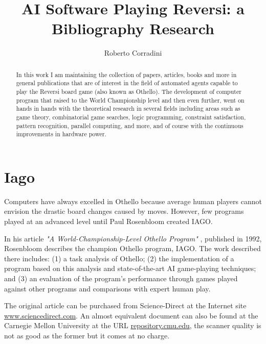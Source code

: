 \documentclass[twoside, 3p, times, a4paper, 11pt, onecolumn]{elsarticle}
\begin{document}
\begin{frontmatter}
  \title{AI Software Playing Reversi: a Bibliography Research}

  \author[rcrr]{Roberto Corradini}
  \address[rcrr]{Indipendent researcher, Milan, Italy - rob\_corradini@yahoo.it}

  \begin{abstract}
    In this work I am maintaining the collection of papers, articles, books and more in general publications
    that are of interest in the field of automated agents capable to play the Reversi board game (also known as Othello).
    The development of computer program that raised to the World Championship level and then even further, went on hands in
    hands with the theoretical research in several fields including areas such as game theory, combinatorial
    game searches, logic programming, constraint satisfaction, pattern recognition, parallel computing, and more,
    and of course with the continuous improvements in hardware power.
  \end{abstract}

\end{frontmatter}

\thispagestyle{empty} %

\section{Iago}\label{sec:iago}
Computers have always excelled in Othello because average human players cannot envision the drastic board changes caused by moves.
However, few programs played at an advanced level until Paul Rosenbloom created IAGO.

In his article {\it "A World-Championship-Level Othello Program"} \cite{Rosenbloom1982},
published in 1992, Rosenbloom describes the champion Othello program, IAGO. The work described there includes:
(1) a task analysis of Othello;
(2) the implementation of a program based on this analysis and state-of-the-art AI game-playing techniques;
and (3) an evaluation of the program's performance through games played against other programs and comparisons
with expert human play.

The original article can be purchased from Science-Direct at the Internet site \url{www.sciencedirect.com}. An almost
equivalent document can also be found at the Carnegie Mellon University at the URL \url{repository.cmu.edu},
the scanner quality is not as good as the former but it comes at no charge. 
\end{document}
